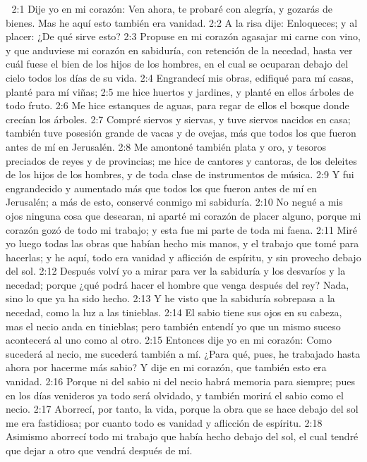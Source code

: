 
2:1 Dije yo en mi corazón: Ven ahora, te probaré con alegría, y gozarás de bienes. Mas he aquí esto también era vanidad.  
2:2 A la risa dije: Enloqueces; y al placer: ¿De qué sirve esto?  
2:3 Propuse en mi corazón agasajar mi carne con vino, y que anduviese mi corazón en sabiduría, con retención de la necedad, hasta ver cuál fuese el bien de los hijos de los hombres, en el cual se ocuparan debajo del cielo todos los días de su vida.  
2:4 Engrandecí mis obras, edifiqué para mí casas, planté para mí viñas;  
2:5 me hice huertos y jardines, y planté en ellos árboles de todo fruto.  
2:6 Me hice estanques de aguas, para regar de ellos el bosque donde crecían los árboles.  
2:7 Compré siervos y siervas, y tuve siervos nacidos en casa; también tuve posesión grande de vacas y de ovejas, más que todos los que fueron antes de mí en Jerusalén.  
2:8 Me amontoné también plata y oro, y tesoros preciados de reyes y de provincias; me hice de cantores y cantoras, de los deleites de los hijos de los hombres, y de toda clase de instrumentos de música. 
2:9 Y fui engrandecido y aumentado más que todos los que fueron antes de mí en Jerusalén; a más de esto, conservé conmigo mi sabiduría.  
2:10 No negué a mis ojos ninguna cosa que desearan, ni aparté mi corazón de placer alguno, porque mi corazón gozó de todo mi trabajo; y esta fue mi parte de toda mi faena.  
2:11 Miré yo luego todas las obras que habían hecho mis manos, y el trabajo que tomé para hacerlas; y he aquí, todo era vanidad y aflicción de espíritu, y sin provecho debajo del sol.  
2:12 Después volví yo a mirar para ver la sabiduría y los desvaríos y la necedad; porque ¿qué podrá hacer el hombre que venga después del rey? Nada, sino lo que ya ha sido hecho.  
2:13 Y he visto que la sabiduría sobrepasa a la necedad, como la luz a las tinieblas.  
2:14 El sabio tiene sus ojos en su cabeza, mas el necio anda en tinieblas; pero también entendí yo que un mismo suceso acontecerá al uno como al otro.  
2:15 Entonces dije yo en mi corazón: Como sucederá al necio, me sucederá también a mí. ¿Para qué, pues, he trabajado hasta ahora por hacerme más sabio? Y dije en mi corazón, que también esto era vanidad.  
2:16 Porque ni del sabio ni del necio habrá memoria para siempre; pues en los días venideros ya todo será olvidado, y también morirá el sabio como el necio.  
2:17 Aborrecí, por tanto, la vida, porque la obra que se hace debajo del sol me era fastidiosa; por cuanto todo es vanidad y aflicción de espíritu.  
2:18 Asimismo aborrecí todo mi trabajo que había hecho debajo del sol, el cual tendré que dejar a otro que vendrá después de mí.  
